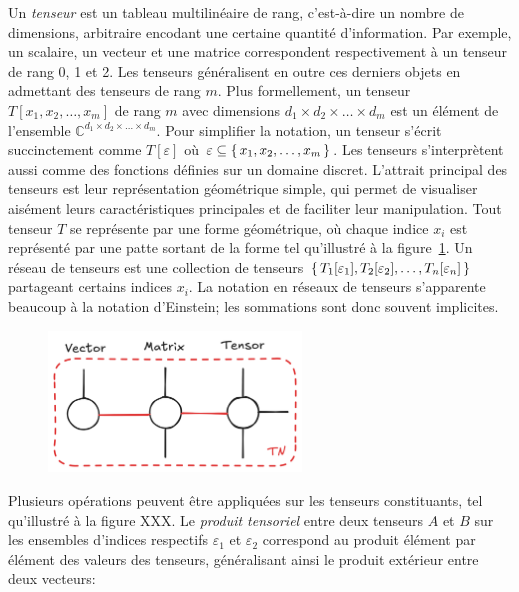 Un \textit{tenseur} est un tableau multilinéaire de rang, c'est-à-dire un nombre de dimensions, arbitraire encodant une certaine quantité d'information. Par exemple, un scalaire, un vecteur et une matrice correspondent respectivement à un tenseur de rang 0, 1 et 2. Les tenseurs généralisent en outre ces derniers objets en admettant des tenseurs de rang $m$. Plus formellement, un tenseur $T[x_{1}, x_{2}, \dots, x_{m}]$ de rang $m$ avec dimensions $d_{1} \times d_{2} \times \dots \times d_{m}$ est un élément de l'ensemble $\mathbb{C}^{d_{1} \times d_{2} \times \dots \times d_{m}}$. Pour simplifier la notation, un tenseur s'écrit succinctement comme $T[\varepsilon]$ où $\varepsilon \subseteq \set{ x_{1}, x_{2}, \dots, x_{m} }$. Les tenseurs s'interprètent aussi comme des fonctions définies sur un domaine discret. L'attrait principal des tenseurs est leur représentation géométrique simple, qui permet de visualiser aisément leurs caractéristiques principales et de faciliter leur manipulation. Tout tenseur $T$ se représente par une forme géométrique, où chaque indice $x_{i}$ est représenté par une patte sortant de la forme tel qu'illustré à la figure~\ref{fig:tensor}. Un réseau de tenseurs est une collection de tenseurs $\set{ T_{1}[\varepsilon_{1}], T_{2}[\varepsilon_{2}], \dots, T_{n}[\varepsilon_{n}] }$ partageant certains indices $x_{i}$. La notation en réseaux de tenseurs s'apparente beaucoup à la notation d'Einstein; les sommations sont donc souvent implicites. 

\begin{figure}[ht!]
    \centering
    \includegraphics[width=0.6\textwidth]{figures/tensor.png}
    \caption{}
    \label{fig:tensor}
\end{figure}

Plusieurs opérations peuvent être appliquées sur les tenseurs constituants, tel qu'illustré à la figure XXX. Le \textit{produit tensoriel} entre deux tenseurs $A$ et $B$ sur les ensembles d'indices respectifs $\varepsilon_{1}$ et $\varepsilon_{2}$ correspond au produit élément par élément des valeurs des tenseurs, généralisant ainsi le produit extérieur entre deux vecteurs:

